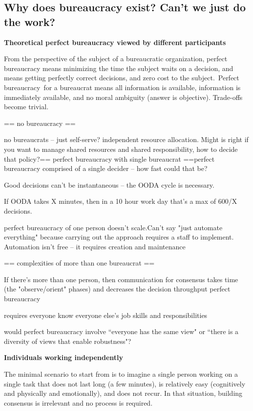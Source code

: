 \subsection{Why does bureaucracy exist? Can't we just do the work?}



\textbf{Theoretical perfect bureaucracy viewed by different participants}

From the perspective of the subject of a bureaucratic organization, perfect bureaucracy  means minimizing the time the subject waits on a decision, and means getting perfectly correct decisions, and zero cost to the subject. Perfect bureaucracy for a bureaucrat means all information is available, information is immediately available, and no moral ambiguity (answer is objective). Trade-offs become trivial.

== no bureaucracy ==

no bureaucrats -- just self-serve? independent resource allocation. Might is right
if you want to manage shared resources and shared responsibility, how to decide that policy?== perfect bureaucracy with single bureaucrat ==perfect bureaucracy comprised of a single decider -- how fast could that be?

Good decisions can't be instantaneous -- the OODA cycle is necessary.

If OODA takes X minutes, then in a 10 hour work day that's a max of 600/X decisions.

perfect bureaucracy of one person doesn't scale.Can't say "just automate everything" because carrying out the approach requires a staff to implement. Automation isn't free -- it requires creation and maintenance

== complexities of more than one bureaucrat ==

If there's more than one person, then communication for consensus takes time (the "observe/orient" phases) and decreases the decision throughput
perfect bureaucracy

requires everyone know everyone else's job skills and responsibilities

would perfect bureaucracy involve ``everyone has the same view" or ``there is a diversity of views that enable robustness"?

\textbf{Individuals working independently}

The minimal scenario to start from is to imagine a single person working on a single task that does not last long (a few minutes), is relatively easy (cognitively and physically and emotionally), and does not recur. In that situation, building consensus is irrelevant and no process is required. 

